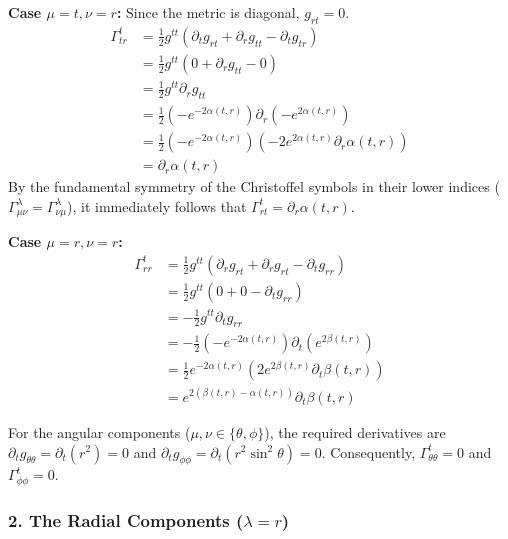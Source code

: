 \documentclass[11pt, a4paper]{report}
\begin{document}
\textbf{Case $\mu = t, \nu = r$:}
Since the metric is diagonal, $g_{rt} = 0$.
\begin{align}
    \Gamma^t_{tr} &= \frac{1}{2} g^{tt} (\partial_t g_{rt} + \partial_r g_{tt} - \partial_t g_{tr}) \nonumber \\
    &= \frac{1}{2} g^{tt} (0 + \partial_r g_{tt} - 0) \nonumber \\
    &= \frac{1}{2} g^{tt} \partial_r g_{tt} \nonumber \\
    &= \frac{1}{2} \left( -e^{-2\alpha(t,r)} \right) \partial_r \left( -e^{2\alpha(t,r)} \right) \nonumber \\
    &= \frac{1}{2} \left( -e^{-2\alpha(t,r)} \right) \left( -2 e^{2\alpha(t,r)} \partial_r \alpha(t,r) \right) \nonumber \\
    &= \partial_r \alpha(t,r)
\end{align}
By the fundamental symmetry of the Christoffel symbols in their lower indices ($\Gamma^\lambda_{\mu\nu} = \Gamma^\lambda_{\nu\mu}$), it immediately follows that $\Gamma^t_{rt} = \partial_r \alpha(t,r)$.

\textbf{Case $\mu = r, \nu = r$:}
\begin{align}
    \Gamma^t_{rr} &= \frac{1}{2} g^{tt} (\partial_r g_{rt} + \partial_r g_{rt} - \partial_t g_{rr}) \nonumber \\
    &= \frac{1}{2} g^{tt} (0 + 0 - \partial_t g_{rr}) \nonumber \\
    &= -\frac{1}{2} g^{tt} \partial_t g_{rr} \nonumber \\
    &= -\frac{1}{2} \left( -e^{-2\alpha(t,r)} \right) \partial_t \left( e^{2\beta(t,r)} \right) \nonumber \\
    &= \frac{1}{2} e^{-2\alpha(t,r)} \left( 2 e^{2\beta(t,r)} \partial_t \beta(t,r) \right) \nonumber \\
    &= e^{2(\beta(t,r) - \alpha(t,r))} \partial_t \beta(t,r)
\end{align}

For the angular components ($\mu, \nu \in \{\theta, \phi\}$), the required derivatives are $\partial_t g_{\theta\theta} = \partial_t (r^2) = 0$ and $\partial_t g_{\phi\phi} = \partial_t (r^2 \sin^2\theta) = 0$. Consequently, $\Gamma^t_{\theta\theta} = 0$ and $\Gamma^t_{\phi\phi} = 0$.

\subsubsection*{2. The Radial Components ($\lambda = r$)}
\end{document}
